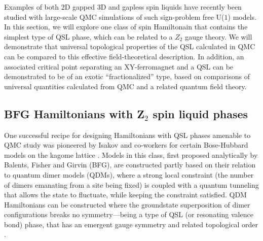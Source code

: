 \documentclass[range]{ar2e}
\begin{document}
Examples of both 2D gapped \cite{Isakov1,Isakov2,Long,TopoEE} 3D and gapless \cite{Isakov3} spin liquids have recently been studied with large-scale QMC simulations of 
such sign-problem free U($1$) models. In this section, we will explore one class of spin Hamiltonain that contains the simplest type of QSL phase, which can be related to a 
$Z_2$ gauge theory.  We will demonstrate that universal topological properties of the QSL calculated in QMC can be compared to this effective field-theoretical description.  In addition, 
an associated critical point separating an XY-ferromagnet and a QSL can be demonstrated to be of an exotic ``fractionalized'' type, based on comparisons of universal 
quantities calculated from QMC and a related quantum field theory.

\subsection{BFG Hamiltonians with Z$_2$ spin liquid phases}

One successful recipe for designing Hamiltonians with QSL phases amenable to QMC study was pioneered by Isakov and co-workers for certain Bose-Hubbard models on the kagome 
lattice \cite{Isakov1, Isakov2, TopoEE}.  Models in this class, first proposed analytically by Balents, Fisher and Girvin \cite{BFG} (BFG), are constructed partly based on their 
relation to quantum dimer models (QDMs), where a strong local constraint (the number of dimers emanating from a site being fixed) is coupled with a quantum tunneling that allows 
the state to fluctuate, while keeping the constraint satisfied. QDM Hamiltonians can be constructed where the groundstate superposition of dimer configurations breaks no 
symmetry---being a type of QSL (or resonating valence bond) phase, that has an emergent gauge symmetry and related topological order \cite{Misguich1}.
\end{document}
